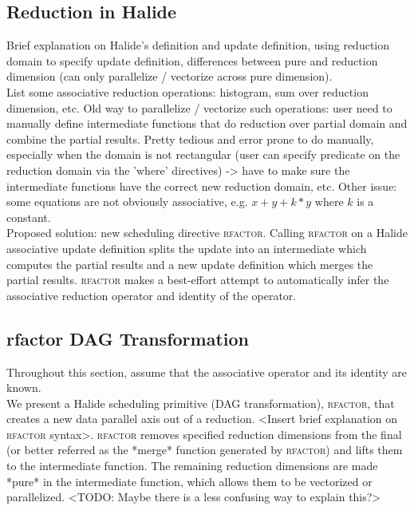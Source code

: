 \subsection{Reduction in Halide}

Brief explanation on Halide's definition and update definition, using reduction domain to specify update definition, differences between pure and reduction dimension (can only parallelize / vectorize across pure dimension). \\

List some associative reduction operations: histogram, sum over reduction dimension, etc. Old way to parallelize / vectorize such operations: user need to manually define intermediate functions that do reduction over partial domain and combine the partial results. Pretty tedious and error prone to do manually, especially when the domain is not rectangular (user can specify predicate on the reduction domain via the 'where' directives) -> have to make sure the intermediate functions have the correct new reduction domain, etc. Other issue: some equations are not obviously associative, e.g. $x + y + k*y$ where $k$ is a constant. \\

Proposed solution: new scheduling directive \textsc{rfactor}. Calling \textsc{rfactor} on a Halide associative update definition splits the update into an intermediate which computes the partial results and a new update definition which merges the partial results. \textsc{rfactor} makes a best-effort attempt to automatically infer the associative reduction operator and identity of the operator.

\subsection{rfactor DAG Transformation}

Throughout this section, assume that the associative operator and its identity are known. \\

We present a Halide scheduling primitive (DAG transformation), \textsc{rfactor}, that creates a new data parallel axis out of a reduction. <Insert brief explanation on \textsc{rfactor} syntax>. \textsc{rfactor} removes specified reduction dimensions from the final (or better referred as the *merge* function generated by \textsc{rfactor}) and lifts them to the intermediate function. The remaining reduction dimensions are made *pure* in the intermediate function, which allows them to be vectorized or parallelized. <TODO: Maybe there is a less confusing way to explain this?>


